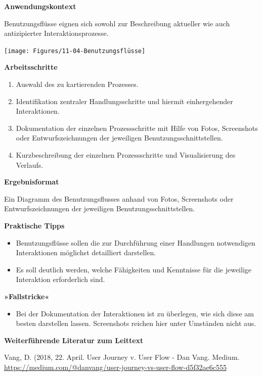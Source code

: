 \documentclass[
  a4paper,
]{book}
\providecommand{\tightlist}{%
  \setlength{\itemsep}{0pt}\setlength{\parskip}{0pt}}
\begin{document}
\textbf{Anwendungskontext}

Benutzungsflüsse eignen sich sowohl zur Beschreibung aktueller wie auch antizipierter Interaktionsprozesse.

\begin{center}\texttt{[image: Figures/11-04-Benutzungsflüsse]} \end{center}

\textbf{Arbeitsschritte}

\begin{enumerate}
\def\labelenumi{\arabic{enumi}.}
\tightlist
\item
  Auswahl des zu kartierenden Prozesses.
\item
  Identifikation zentraler Handlungsschritte und hiermit einhergehender Interaktionen.
\item
  Dokumentation der einzelnen Prozessschritte mit Hilfe von Fotos, Screenshots oder Entwurfszeichnungen der jeweiligen Benutzungsschnittstellen.
\item
  Kurzbeschreibung der einzelnen Prozessschritte und Visualisierung des Verlaufs.
\end{enumerate}

\textbf{Ergebnisformat}

Ein Diagramm des Benutzungsflusses anhand von Fotos, Screenshots oder Entwurfszeichnungen der jeweiligen Benutzungsschnittstellen.

\textbf{Praktische Tipps}

\begin{itemize}
\tightlist
\item
  Benutzungsflüsse sollen die zur Durchführung einer Handlungen notwendigen Interaktionen möglichst detailliert darstellen.
\item
  Es soll deutlich werden, welche Fähigkeiten und Kenntnisse für die jeweilige Interaktion erforderlich sind.
\end{itemize}

\textbf{»Fallstricke«}

\begin{itemize}
\tightlist
\item
  Bei der Dokumentation der Interaktionen ist zu überlegen, wie sich diese am besten darstellen lassen. Screenshots reichen hier unter Umständen nicht aus.
\end{itemize}

\textbf{Weiterführende Literatur zum Leittext}

Vang, D. (2018, 22. April. User Journey v. User Flow - Dan Vang. Medium.
\url{https://medium.com/@danvang/user-journey-vs-user-flow-d5f32ae6c555}
\end{document}
